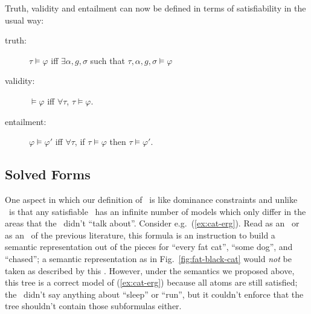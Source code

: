 Truth, validity and entailment can now be defined in terms of
satisfiability in the usual way:
\begin{definition}\label{defn:entailment}
\begin{description}
\item   [truth:] $\tau\models \varphi$ iff $\exists \alpha,g,\sigma$  such
  that $\tau,\alpha,g,\sigma\models \varphi$
\item   [validity:] $\models \varphi$ iff $\forall \tau$, $\tau\models \varphi$.
\item   [entailment:] $\varphi\models \varphi'$ iff $\forall \tau$, if
  $\tau\models \varphi$ then $\tau\models \varphi'$.
\end{description}
\end{definition}



\subsection{Solved Forms}

One aspect in which our definition of \rmrs\ is like dominance
constraints and unlike \mrs\ is that any satisfiable \rmrs\ has an
infinite number of models which only differ in the areas that the
\rmrs\ didn't ``talk about''.  Consider e.g.\ (\ref{ex:cat-erg}).
Read as an \mrs\ or as an \rmrs\ of the previous literature, this
formula is an instruction to build a semantic representation out of
the pieces for ``every fat cat'', ``some dog'', and ``chased''; a
semantic representation as in Fig.~\ref{fig:fat-black-cat} would
\emph{not} be taken as described by this \rmrs.  However, under the
semantics we proposed above, this tree is a correct model of
(\ref{ex:cat-erg}) because all atoms are still satisfied; the \rmrs\
didn't say anything about ``sleep'' or ``run'', but it couldn't
enforce that the tree shouldn't contain those subformulas either.

